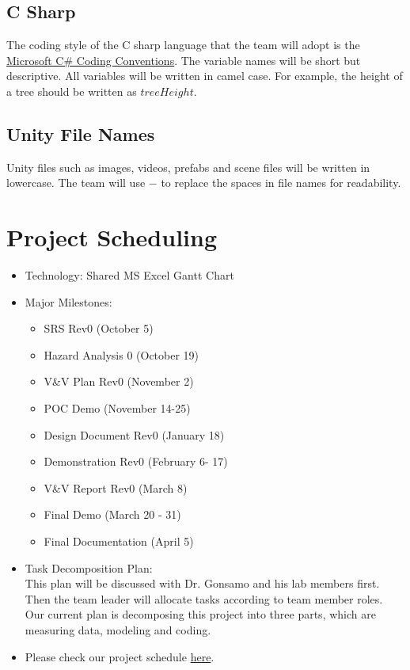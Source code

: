 \documentclass{article}
\begin{document}
\subsection{C Sharp}
The coding style of the C sharp language that the team will adopt is the \href{https://learn.microsoft.com/en-us/dotnet/csharp/fundamentals/coding-style/coding-conventions}{Microsoft C\# Coding Conventions}. The variable names will be short but descriptive. All variables will be written in camel case. For example, the height of a tree should be written as $treeHeight$.

\subsection{Unity File Names}
Unity files such as images, videos, prefabs and scene files will be written in lowercase. The team will use $-$ to replace the spaces in file names for readability.   

\section{Project Scheduling}
\begin{itemize}
    \item Technology: Shared MS Excel Gantt Chart
    \item Major Milestones: 
    \begin{itemize}
        \item SRS Rev0 (October 5)
        \item Hazard Analysis 0 (October 19)
        \item V\&V Plan Rev0 (November 2)
        \item POC Demo (November 14-25)
        \item Design Document Rev0 (January 18)
        \item Demonstration Rev0 (February 6- 17)
        \item V\&V Report Rev0  (March 8)
        \item Final Demo (March 20 - 31)
        \item Final Documentation (April 5)
    \end{itemize}
    \item Task Decomposition Plan:\\ This plan will be discussed with Dr. Gonsamo and his lab
    members first. Then the team leader will allocate tasks according to team member roles. 
    Our current plan is decomposing this project into three parts, which are measuring data, modeling
    and coding.
    \item Please check our project schedule \href{https://github.com/wuj187/DigitalTwinCAS/tree/main/docs/DevelopmentPlan/Project_Schedule}{here}.
\end{itemize}
\end{document}
